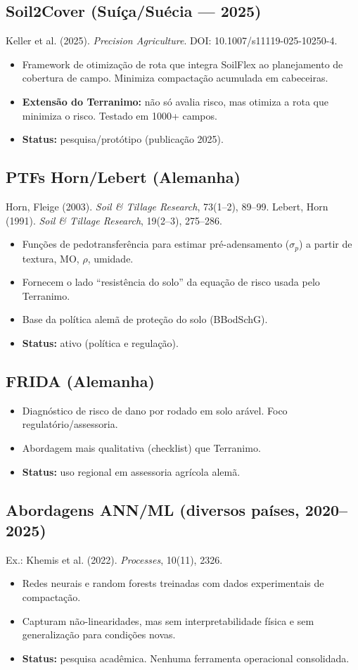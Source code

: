 \documentclass[12pt,a4paper]{article}
\newcommand{\SubsectionKeep}[1]{\needspace{10\baselineskip}\subsection{#1}}
\newenvironment{NoBreakItemize}
{\begin{samepage}\begin{itemize}}
{\end{itemize}\end{samepage}}
\begin{document}
\SubsectionKeep{Soil2Cover (Suíça/Suécia --- 2025)}
Keller et al. (2025). \textit{Precision Agriculture}. DOI: 10.1007/s11119-025-10250-4.

\begin{NoBreakItemize}
  \item Framework de otimização de rota que integra SoilFlex ao planejamento de cobertura de campo. Minimiza compactação acumulada em cabeceiras.
  \item \textbf{Extensão do Terranimo:} não só avalia risco, mas otimiza a rota que minimiza o risco. Testado em 1000+ campos.
  \item \textbf{Status:} pesquisa/protótipo (publicação 2025).
\end{NoBreakItemize}

\SubsectionKeep{PTFs Horn/Lebert (Alemanha)}
Horn, Fleige (2003). \textit{Soil \& Tillage Research}, 73(1--2), 89--99.
Lebert, Horn (1991). \textit{Soil \& Tillage Research}, 19(2--3), 275--286.

\begin{NoBreakItemize}
  \item Funções de pedotransferência para estimar pré-adensamento ($\sigma_p$) a partir de textura, MO, $\rho$, umidade.
  \item Fornecem o lado ``resistência do solo'' da equação de risco usada pelo Terranimo.
  \item Base da política alemã de proteção do solo (BBodSchG).
  \item \textbf{Status:} ativo (política e regulação).
\end{NoBreakItemize}

\SubsectionKeep{FRIDA (Alemanha)}
\begin{NoBreakItemize}
  \item Diagnóstico de risco de dano por rodado em solo arável. Foco regulatório/assessoria.
  \item Abordagem mais qualitativa (checklist) que Terranimo.
  \item \textbf{Status:} uso regional em assessoria agrícola alemã.
\end{NoBreakItemize}

\SubsectionKeep{Abordagens ANN/ML (diversos países, 2020--2025)}
Ex.: Khemis et al. (2022). \textit{Processes}, 10(11), 2326.

\begin{NoBreakItemize}
  \item Redes neurais e random forests treinadas com dados experimentais de compactação.
  \item Capturam não-linearidades, mas sem interpretabilidade física e sem generalização para condições novas.
  \item \textbf{Status:} pesquisa acadêmica. Nenhuma ferramenta operacional consolidada.
\end{NoBreakItemize}
\end{document}
